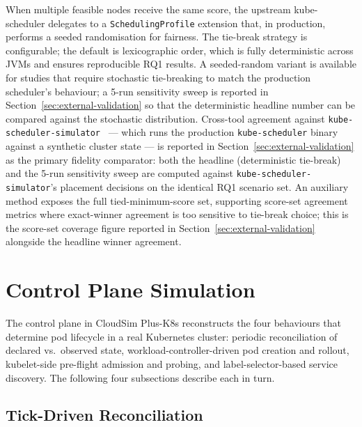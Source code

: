 \documentclass[ASNA,twocolumn]{USG}
\newcommand{\ckm}{CloudSim Plus-K8s\xspace}
\begin{document}
    When multiple feasible nodes receive the same score, the upstream
    kube-scheduler delegates to a \texttt{SchedulingProfile} extension
    that, in production, performs a seeded randomisation for fairness.
    The tie-break strategy is configurable; the default is lexicographic
    order, which is fully deterministic across JVMs and ensures
    reproducible RQ1 results. A seeded-random variant is available for
    studies that require stochastic tie-breaking to match the production
    scheduler's behaviour; a 5-run sensitivity sweep is reported in
    Section~\ref{sec:external-validation} so that the deterministic
    headline number can be compared against the stochastic distribution.
    Cross-tool agreement against
    \texttt{kube-scheduler-simulator}~\cite{KubeSchSim2025} --- which runs
    the production \texttt{kube-scheduler} binary against a synthetic
    cluster state --- is reported in Section~\ref{sec:external-validation}
    as the primary fidelity comparator: both the headline (deterministic
    tie-break) and the 5-run sensitivity sweep are computed against
    \texttt{kube-scheduler-simulator}'s placement decisions on the
    identical RQ1 scenario set. An auxiliary method exposes the full
    tied-minimum-score set, supporting score-set agreement metrics where
    exact-winner agreement is too sensitive to tie-break choice; this is
    the score-set coverage figure reported in
    Section~\ref{sec:external-validation} alongside the headline winner
    agreement.

    \section{Control Plane Simulation}\label{sec:controlplane}

    The control plane in \ckm reconstructs the four
    behaviours that determine pod lifecycle in a real Kubernetes
    cluster: periodic reconciliation of declared vs.\ observed state,
    workload-controller-driven pod creation and rollout, kubelet-side
    pre-flight admission and probing, and label-selector-based service
    discovery. The following four subsections describe each in turn.

    \subsection{Tick-Driven Reconciliation}
\end{document}
